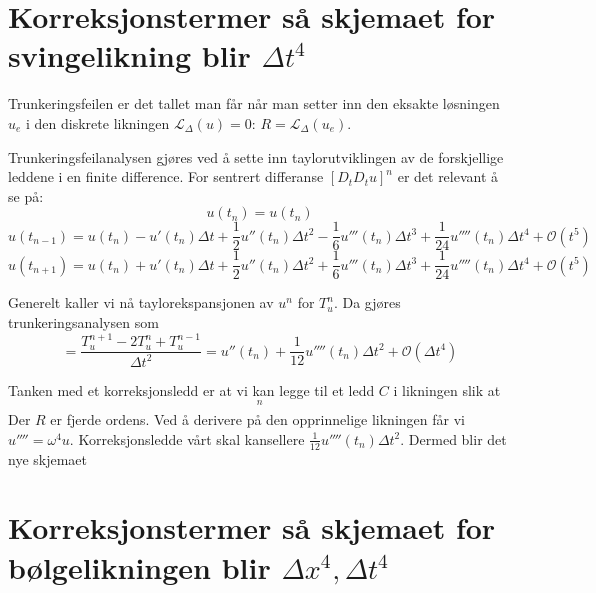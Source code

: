 \documentclass[a4paper, 10pt]{article}
\newcommand{\mc}{\mathcal}
\begin{document}
\section{Korreksjonstermer så skjemaet for svingelikning blir $\Delta t^4$}
Trunkeringsfeilen er det tallet man får når man setter inn den eksakte løsningen $u_e$ i den diskrete likningen $\mc{L}_{\Delta}(u) = 0$: $R = \mc{L}_{\Delta}(u_e)$.  

Trunkeringsfeilanalysen gjøres ved å sette inn taylorutviklingen av de forskjellige leddene i en finite difference. 
For sentrert differanse $[D_tD_t u]^n$ er det relevant å se på:
\begin{equation}
	u(t_n) = u(t_n)
\end{equation}
\begin{equation}
	u(t_{n-1}) = u(t_n)-u'(t_n)\Delta t + \frac{1}{2} u''(t_n)\Delta t^2 - \frac{1}{6}u'''(t_n)\Delta t^3 + \frac{1}{24} u''''(t_n)\Delta t^4 + \mathcal{O}(t^5)
\end{equation}
\begin{equation}
	u(t_{n+1}) = u(t_n)+u'(t_n)\Delta t + \frac{1}{2} u''(t_n)\Delta t^2 + \frac{1}{6}u'''(t_n)\Delta t^3 + \frac{1}{24} u''''(t_n)\Delta t^4 + \mathcal{O}(t^5)
\end{equation}

Generelt kaller vi nå taylorekspansjonen av $u^n$ for $T_u^n$. Da gjøres trunkeringsanalysen som 
\begin{equation}
 	[D_tD_t u] = \frac{T_u^{n+1} - 2T_u^{n} + T_u^{n-1}}{\Delta t^2} = u''(t_n) + \frac{1}{12}u''''(t_n) \Delta t^2 + \mathcal{O}(\Delta t^4)
 \end{equation} 

Tanken med et korreksjonsledd er at vi kan legge til et ledd $C$ i likningen slik at
\begin{equation}
	[D_tD_t u_e + \omega^2u_e = C+R]^n
\end{equation}
Der $R$ er fjerde ordens.
Ved å derivere på den opprinnelige likningen får vi $u'''' = \omega^4 u$.
Korreksjonsledde vårt skal kansellere $\frac{1}{12}u''''(t_n)\Delta t^2$. Dermed blir det nye skjemaet
\begin{equation}
	[D_t D_t u + \omega^2(1 - \frac{1}{12}\omega^2\Delta t^2)u = 0]
\end{equation}
\section{Korreksjonstermer så skjemaet for bølgelikningen blir $\Delta x^4, \Delta t^4$}
\end{document}
